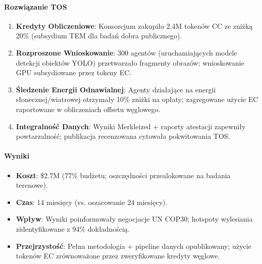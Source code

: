 \documentclass[11pt]{article}
\begin{document}
\paragraph{Rozwiązanie TOS}
\begin{enumerate}[noitemsep]
  \item \textbf{Kredyty Obliczeniowe}: Konsorcjum zakupiło 2.4M tokenów CC ze zniżką 20\% (subsydium TEM dla badań dobra publicznego).
  \item \textbf{Rozproszone Wnioskowanie}: 300 agentów (uruchamiających modele detekcji obiektów YOLO) przetwarzało fragmenty obrazów; wnioskowanie GPU subsydiowane przez tokeny EC.
  \item \textbf{Śledzenie Energii Odnawialnej}: Agenty działające na energii słonecznej/wiatrowej otrzymały 10\% zniżki na opłaty; zagregowane użycie EC raportowane w obliczeniach offsetu węglowego.
  \item \textbf{Integralność Danych}: Wyniki Merkleized + raporty atestacji zapewniły powtarzalność; publikacja recenzowana cytowała pokwitowania TOS.
\end{enumerate}

\paragraph{Wyniki}
\begin{itemize}[noitemsep]
  \item \textbf{Koszt}: \$2.7M (77\% budżetu; oszczędności przealokowane na badania terenowe).
  \item \textbf{Czas}: 14 miesięcy (vs. oszacowanie 24 miesięcy).
  \item \textbf{Wpływ}: Wyniki poinformowały negocjacje UN COP30; hotspoty wylesiania zidentyfikowane z 94\% dokładnością.
  \item \textbf{Przejrzystość}: Pełna metodologia + pipeline danych opublikowany; użycie tokenów EC zrównoważone przez zweryfikowane kredyty węglowe.
\end{itemize}
\end{document}

